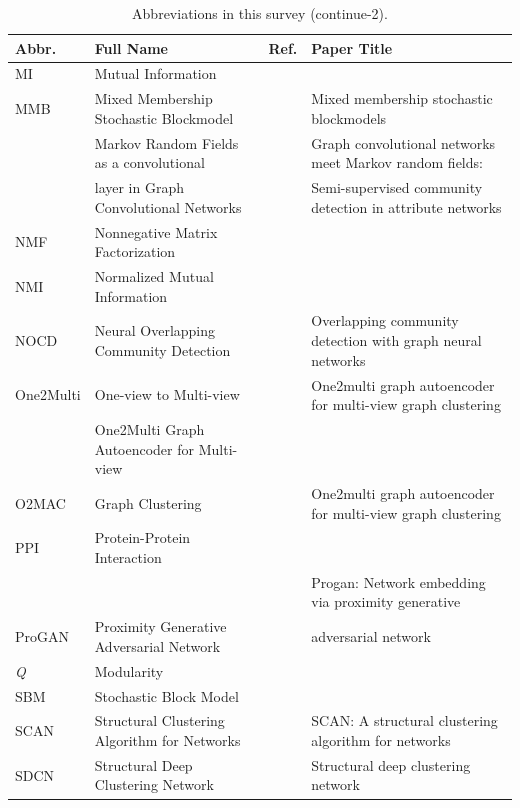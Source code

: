 \begin{table}[!t]
\centering \footnotesize
\renewcommand\arraystretch{1.2}
\caption{Abbreviations in this survey (continue-2).}
\begin{tabular}{llll}
\toprule[1pt]
\textbf{Abbr.} & \textbf{Full Name} & \textbf{Ref.} & \textbf{Paper Title} \\ \midrule
\rowcolor{gray!30}
MI & Mutual Information &  &  \\
MMB & Mixed Membership Stochastic Blockmodel &  & Mixed membership stochastic blockmodels \\ 
\rowcolor{gray!30}
& Markov Random Fields as a convolutional &  & Graph convolutional networks meet Markov random fields: \\
\rowcolor{gray!30}
\multirow{-2}{*}{MRFasGCN} & layer in Graph Convolutional Networks & \multirow{-2}{*}{} & Semi-supervised community detection in attribute networks \\  \midrule
NMF & Nonnegative Matrix Factorization &  &  \\
\rowcolor{gray!30}
NMI & Normalized Mutual Information&  &  \\
NOCD & Neural Overlapping Community Detection &  & Overlapping community detection with graph neural networks \\ \midrule
\rowcolor{gray!30}
One2Multi & One-view to Multi-view &  & One2multi graph autoencoder for multi-view graph clustering \\
& One2Multi Graph Autoencoder for Multi-view &  & \\ 
\multirow{-2}{*}{O2MAC} & Graph Clustering & \multirow{-2}{*}{} & \multirow{-2}{*}{One2multi graph autoencoder for multi-view graph clustering} \\ \midrule
\rowcolor{gray!30}
PPI & Protein-Protein Interaction & &  \\ 
&  &  & Progan: Network embedding via proximity generative \\
\multirow{-2}{*}{ProGAN} & \multirow{-2}{*}{Proximity Generative Adversarial Network} & \multirow{-2}{*}{} & adversarial network \\ \midrule
\rowcolor{gray!30}
\textit{Q} & Modularity &  &  \\ \midrule
SBM & Stochastic Block Model &  &  \\
\rowcolor{gray!30}
SCAN & Structural Clustering Algorithm for Networks &  & SCAN: A structural clustering algorithm for networks \\
SDCN & Structural Deep Clustering Network &  & Structural deep clustering network \\

\end{tabular}
\end{table}
